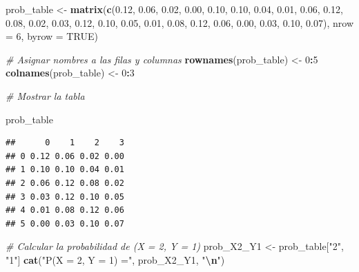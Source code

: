 \documentclass[
]{article}
\newenvironment{Shaded}{\begin{snugshade}}{\end{snugshade}}
\newcommand{\AttributeTok}[1]{\textcolor[rgb]{0.13,0.29,0.53}{#1}}
\newcommand{\CommentTok}[1]{\textcolor[rgb]{0.56,0.35,0.01}{\textit{#1}}}
\newcommand{\ConstantTok}[1]{\textcolor[rgb]{0.56,0.35,0.01}{#1}}
\newcommand{\DecValTok}[1]{\textcolor[rgb]{0.00,0.00,0.81}{#1}}
\newcommand{\FloatTok}[1]{\textcolor[rgb]{0.00,0.00,0.81}{#1}}
\newcommand{\FunctionTok}[1]{\textcolor[rgb]{0.13,0.29,0.53}{\textbf{#1}}}
\newcommand{\NormalTok}[1]{#1}
\newcommand{\OtherTok}[1]{\textcolor[rgb]{0.56,0.35,0.01}{#1}}
\newcommand{\SpecialCharTok}[1]{\textcolor[rgb]{0.81,0.36,0.00}{\textbf{#1}}}
\newcommand{\StringTok}[1]{\textcolor[rgb]{0.31,0.60,0.02}{#1}}
\begin{document}
\begin{Shaded}
\begin{Highlighting}[]
\NormalTok{prob\_table }\OtherTok{\textless{}{-}} \FunctionTok{matrix}\NormalTok{(}\FunctionTok{c}\NormalTok{(}\FloatTok{0.12}\NormalTok{, }\FloatTok{0.06}\NormalTok{, }\FloatTok{0.02}\NormalTok{, }\FloatTok{0.00}\NormalTok{,}
                       \FloatTok{0.10}\NormalTok{, }\FloatTok{0.10}\NormalTok{, }\FloatTok{0.04}\NormalTok{, }\FloatTok{0.01}\NormalTok{,}
                       \FloatTok{0.06}\NormalTok{, }\FloatTok{0.12}\NormalTok{, }\FloatTok{0.08}\NormalTok{, }\FloatTok{0.02}\NormalTok{,}
                       \FloatTok{0.03}\NormalTok{, }\FloatTok{0.12}\NormalTok{, }\FloatTok{0.10}\NormalTok{, }\FloatTok{0.05}\NormalTok{,}
                       \FloatTok{0.01}\NormalTok{, }\FloatTok{0.08}\NormalTok{, }\FloatTok{0.12}\NormalTok{, }\FloatTok{0.06}\NormalTok{,}
                       \FloatTok{0.00}\NormalTok{, }\FloatTok{0.03}\NormalTok{, }\FloatTok{0.10}\NormalTok{, }\FloatTok{0.07}\NormalTok{), }
                     \AttributeTok{nrow =} \DecValTok{6}\NormalTok{, }\AttributeTok{byrow =} \ConstantTok{TRUE}\NormalTok{)}

\CommentTok{\# Asignar nombres a las filas y columnas}
\FunctionTok{rownames}\NormalTok{(prob\_table) }\OtherTok{\textless{}{-}} \DecValTok{0}\SpecialCharTok{:}\DecValTok{5}
\FunctionTok{colnames}\NormalTok{(prob\_table) }\OtherTok{\textless{}{-}} \DecValTok{0}\SpecialCharTok{:}\DecValTok{3}

\CommentTok{\# Mostrar la tabla}

\NormalTok{prob\_table}
\end{Highlighting}
\end{Shaded}

\begin{verbatim}
##      0    1    2    3
## 0 0.12 0.06 0.02 0.00
## 1 0.10 0.10 0.04 0.01
## 2 0.06 0.12 0.08 0.02
## 3 0.03 0.12 0.10 0.05
## 4 0.01 0.08 0.12 0.06
## 5 0.00 0.03 0.10 0.07
\end{verbatim}

\begin{Shaded}
\begin{Highlighting}[]
\CommentTok{\# Calcular la probabilidad de (X = 2, Y = 1)}
\NormalTok{prob\_X2\_Y1 }\OtherTok{\textless{}{-}}\NormalTok{ prob\_table[}\StringTok{"2"}\NormalTok{, }\StringTok{"1"}\NormalTok{]}
\FunctionTok{cat}\NormalTok{(}\StringTok{"P(X = 2, Y = 1) ="}\NormalTok{, prob\_X2\_Y1, }\StringTok{"}\SpecialCharTok{\textbackslash{}n}\StringTok{"}\NormalTok{)}
\end{Highlighting}
\end{Shaded}
\end{document}

